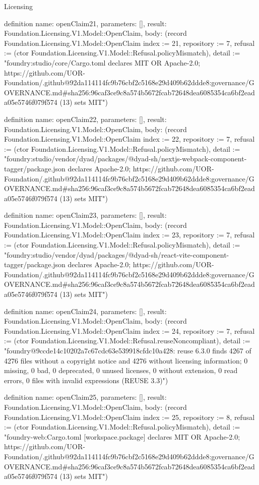 \begin{lexlean}{Licensing}
\begin{semanticmodule}
definition{
  name: openClaim21,
  parameters: [],
  result: Foundation.Licensing.V1.Model::OpenClaim,
  body: (record Foundation.Licensing.V1.Model::OpenClaim {index := 21, repository := 7, refusal := (ctor Foundation.Licensing.V1.Model::Refusal.policyMismatch), detail := "foundry:studio/core/Cargo.toml declares MIT OR Apache-2.0; https://github.com/UOR-Foundation/.github@92da114114fc9b76cbf2c5168e29d409b62ddde8:governance/GOVERNANCE.md#sha256:96caf3ce9c8a574b5672fcab72648dea6085354ca6bf2eada05e5746f079f574 (13) sets MIT"})
}

definition{
  name: openClaim22,
  parameters: [],
  result: Foundation.Licensing.V1.Model::OpenClaim,
  body: (record Foundation.Licensing.V1.Model::OpenClaim {index := 22, repository := 7, refusal := (ctor Foundation.Licensing.V1.Model::Refusal.policyMismatch), detail := "foundry:studio/vendor/dyad/packages/@dyad-sh/nextjs-webpack-component-tagger/package.json declares Apache-2.0; https://github.com/UOR-Foundation/.github@92da114114fc9b76cbf2c5168e29d409b62ddde8:governance/GOVERNANCE.md#sha256:96caf3ce9c8a574b5672fcab72648dea6085354ca6bf2eada05e5746f079f574 (13) sets MIT"})
}

definition{
  name: openClaim23,
  parameters: [],
  result: Foundation.Licensing.V1.Model::OpenClaim,
  body: (record Foundation.Licensing.V1.Model::OpenClaim {index := 23, repository := 7, refusal := (ctor Foundation.Licensing.V1.Model::Refusal.policyMismatch), detail := "foundry:studio/vendor/dyad/packages/@dyad-sh/react-vite-component-tagger/package.json declares Apache-2.0; https://github.com/UOR-Foundation/.github@92da114114fc9b76cbf2c5168e29d409b62ddde8:governance/GOVERNANCE.md#sha256:96caf3ce9c8a574b5672fcab72648dea6085354ca6bf2eada05e5746f079f574 (13) sets MIT"})
}

definition{
  name: openClaim24,
  parameters: [],
  result: Foundation.Licensing.V1.Model::OpenClaim,
  body: (record Foundation.Licensing.V1.Model::OpenClaim {index := 24, repository := 7, refusal := (ctor Foundation.Licensing.V1.Model::Refusal.reuseNoncompliant), detail := "foundry@9ccde14c10202a7c67cdc63e539918cfdc10a428: reuse 6.3.0 finds 4267 of 4276 files without a copyright notice and 4276 without licensing information; 0 missing, 0 bad, 0 deprecated, 0 unused licenses, 0 without extension, 0 read errors, 0 files with invalid expressions (REUSE 3.3)"})
}

definition{
  name: openClaim25,
  parameters: [],
  result: Foundation.Licensing.V1.Model::OpenClaim,
  body: (record Foundation.Licensing.V1.Model::OpenClaim {index := 25, repository := 8, refusal := (ctor Foundation.Licensing.V1.Model::Refusal.policyMismatch), detail := "foundry-web:Cargo.toml [workspace.package] declares MIT OR Apache-2.0; https://github.com/UOR-Foundation/.github@92da114114fc9b76cbf2c5168e29d409b62ddde8:governance/GOVERNANCE.md#sha256:96caf3ce9c8a574b5672fcab72648dea6085354ca6bf2eada05e5746f079f574 (13) sets MIT"})
}


\end{semanticmodule}
\end{lexlean}
